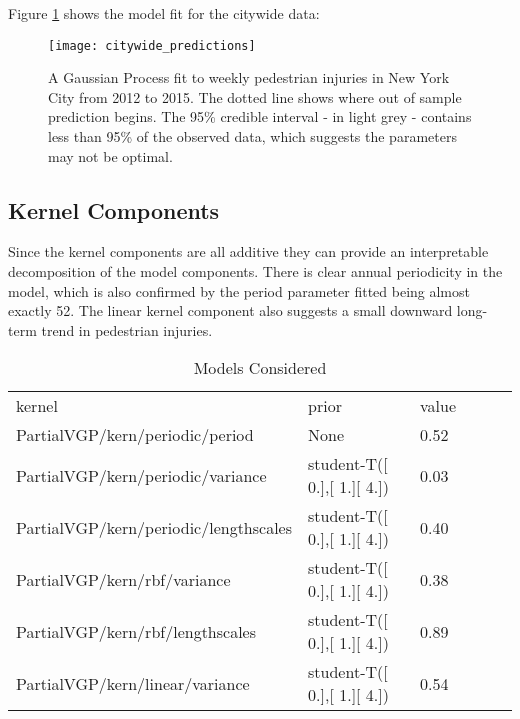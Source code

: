  Figure \ref{city_preds} shows the model fit for the citywide data:

 \begin{figure}[h!]
   \centering
   \caption{A Gaussian Process fit to weekly pedestrian injuries in New York City from 2012 to 2015. The dotted line shows where out of sample prediction begins. The 95\% credible interval - in light grey - contains less than 95\% of the observed data, which suggests the parameters may not be optimal.}
   \texttt{[image: citywide\_predictions]}
   \label{city_preds}
 \end{figure}


\subsection{Kernel Components}

Since the kernel components are all additive they can provide an interpretable decomposition of the model components. There is clear annual periodicity in the model, which is also confirmed by the period parameter fitted being almost exactly 52. The linear kernel component also suggests a small downward long-term trend in pedestrian injuries.

\begin{table}[h!]
\centering
\caption{Models Considered}
\label{citywide_parameters}
\begin{tabular}{@{}llllll@{}}
\toprule
kernel                                      & prior                                   & value \\
PartialVGP/kern/periodic/period       & None                                    & 0.52 \\
PartialVGP/kern/periodic/variance     & student-T({[} 0.{]},{[} 1.{]}{[} 4.{]}) & 0.03  \\
PartialVGP/kern/periodic/lengthscales & student-T({[} 0.{]},{[} 1.{]}{[} 4.{]}) & 0.40  \\
PartialVGP/kern/rbf/variance          & student-T({[} 0.{]},{[} 1.{]}{[} 4.{]}) & 0.38  \\
PartialVGP/kern/rbf/lengthscales      & student-T({[} 0.{]},{[} 1.{]}{[} 4.{]}) & 0.89  \\
PartialVGP/kern/linear/variance       & student-T({[} 0.{]},{[} 1.{]}{[} 4.{]}) & 0.54
\end{tabular}
\end{table}



